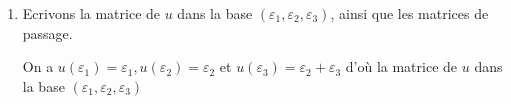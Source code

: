 {{\begin {enumerate}
\begin {enumerate}
D\'eterminons un vecteur propre $\varepsilon_1$ de $u$ non colin\'eaire \`a $\varepsilon_2$.
$$A\begin{pmatrix}x \\  y \\  z\end{pmatrix}
=\begin{pmatrix}x \\  y \\  z\end{pmatrix}\iff\left\{\begin{aligned}3x+2y-2z &= x \\  -x+z &=y \\  x+y &=z\end{aligned}\right.\iff x+y-z=0.$$
On peut prendre le vecteur $\varepsilon_1=(0,1,1)$ qui n'est pas colin\'eaire \`a $\varepsilon_2$.

    \item   Ecrivons la matrice de $u$ dans la base $(\varepsilon_1,\varepsilon_2,\varepsilon_3)$, ainsi que les matrices de passage.

On a $u(\varepsilon_1)=\varepsilon_1,u(\varepsilon_2)=\varepsilon_2$ et $u(\varepsilon_3)=\varepsilon_2+\varepsilon_3$ d'o\`u la matrice de $u$ dans la base $(\varepsilon_1,\varepsilon_2,\varepsilon_3)$


\end{enumerate}
\end{enumerate}}}
